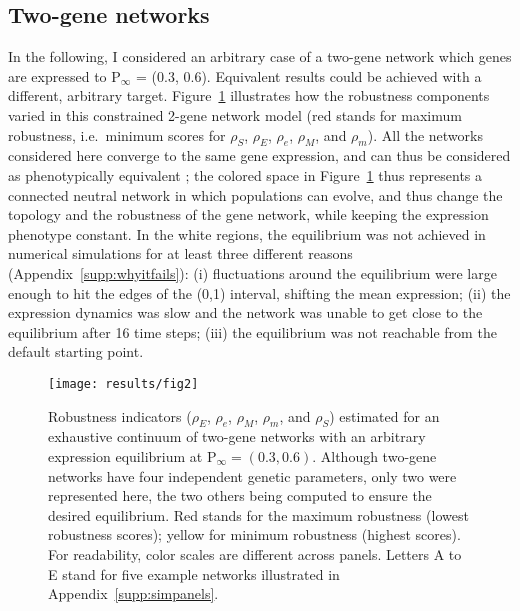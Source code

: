 \documentclass[10pt,a4paper]{article}
\newcommand{\stability}{{\rho_S}}
\newcommand{\earlyenv}{{\rho_E}}
\newcommand{\lateenv}{{\rho_e}}
\newcommand{\earlymut}{{\rho_M}}
\newcommand{\latemut}{{\rho_m}}
\newcommand{\Pp}{\bm{\mathrm P}}
\newcommand{\SupMat}{Appendix~}
\begin{document}
\subsection{Two-gene networks}

In the following, I considered an arbitrary case of a two-gene network which genes are expressed to $\Pp_\infty$ = (0.3, 0.6). Equivalent results could be achieved with a different, arbitrary target. Figure~\ref{fig:imgpanels} illustrates how the robustness components varied in this constrained 2-gene network model (red stands for maximum robustness, i.e.\ minimum scores for $\stability$, $\earlyenv$, $\lateenv$, $\earlymut$, and $\latemut$). All the networks considered here converge to the same gene expression, and can thus be considered as phenotypically equivalent ; the colored space in Figure~\ref{fig:imgpanels} thus represents a connected neutral network in which populations can evolve, and thus change the topology and the robustness of the gene network, while keeping the expression phenotype constant. In the white regions, the equilibrium was not achieved in numerical simulations for at least three different reasons (\SupMat \ref{supp:whyitfails}): (i) fluctuations around the equilibrium were large enough to hit the edges of the (0,1) interval, shifting the mean expression; (ii) the expression dynamics was slow and the network was unable to get close to the equilibrium after 16 time steps; (iii) the equilibrium was not reachable from the default starting point.

\begin{figure}[t]
\begin{adjustwidth}{-1.5in}{0in}
\begin{flushright}
\texttt{[image: results/fig2]}
\caption{\color{Gray} \label{fig:imgpanels} Robustness indicators ($\earlyenv$, $\lateenv$, $\earlymut$, $\latemut$, and $\stability$) estimated for an exhaustive continuum of two-gene networks with an arbitrary expression equilibrium at $\Pp_\infty = (0.3, 0.6)$. Although two-gene networks have four independent genetic parameters, only two were represented here, the two others being computed to ensure the desired equilibrium. Red stands for the maximum robustness (lowest robustness scores); yellow for minimum robustness (highest scores). For readability, color scales are different across panels. Letters A to E stand for five example networks illustrated in \SupMat \ref{supp:simpanels}.}
\end{flushright}\end{adjustwidth}
\end{figure}
\end{document}

